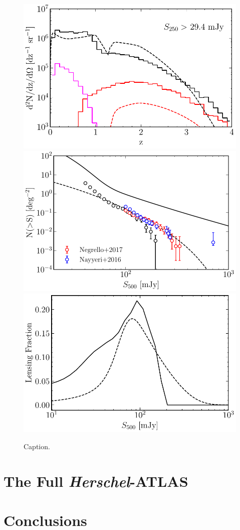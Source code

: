 \begin{figure}
    \centering
    \includegraphics[height=0.3\textheight]{Figures/lens_redshift_distribution.pdf}
    \includegraphics[height=0.3\textheight]{Figures/lens_number_counts.pdf}
    \includegraphics[height=0.3\textheight]{Figures/lensing_fraction.pdf}
    \caption{Caption.}
\end{figure}

\section{The Full \textit{Herschel}-ATLAS}

\section{Conclusions}

\listoftodos